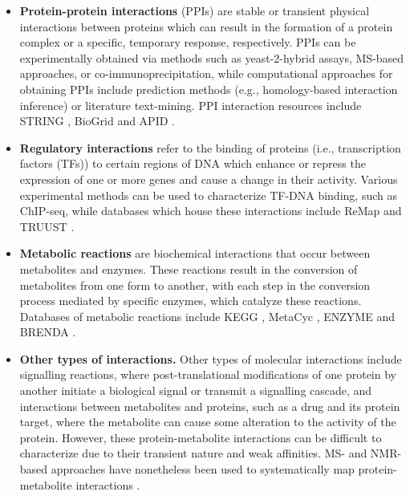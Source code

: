 \begin{itemize}
    \item   \textbf{Protein-protein interactions} (PPIs) are stable or transient physical interactions between proteins which can result in the formation of a protein complex or a specific, temporary response, respectively. PPIs can be experimentally obtained via methods such as yeast-2-hybrid assays, MS-based approaches, or co-immunoprecipitation, while computational approaches for obtaining PPIs include prediction methods (e.g., homology-based interaction inference) or literature text-mining. PPI interaction resources include STRING \parencite{szklarczyk2021}, BioGrid \parencite{oughtred2019} and APID \parencite{alonso2019}. 

    \item   \textbf{Regulatory interactions} refer to the binding of proteins (i.e., transcription factors (TFs)) to certain regions of DNA which enhance or repress the expression of one or more genes and cause a change in their activity. Various experimental methods can be used to characterize TF-DNA binding, such as ChIP-seq, while databases which house these interactions include ReMap \parencite{hammal2022} and TRUUST \parencite{han2018}. 

    \item   \textbf{Metabolic reactions} are biochemical interactions that occur between metabolites and enzymes. These reactions result in the conversion of metabolites from one form to another, with each step in the conversion process mediated by specific enzymes, which catalyze these reactions. Databases of metabolic reactions include KEGG \parencite{kanehisa2000}, MetaCyc \parencite{caspi2014}, ENZYME \parencite{bairoch2000} and BRENDA \parencite{chang2021}. 
    
    \item   \textbf{Other types of interactions.} Other types of molecular interactions include signalling reactions, where post-translational modifications of one protein by another initiate a biological signal or transmit a signalling cascade, and interactions between metabolites and proteins, such as a drug and its protein target, where the metabolite can cause some alteration to the activity of the protein. However, these protein-metabolite interactions can be difficult to characterize due to their transient nature and weak affinities. MS- and NMR- based approaches have nonetheless been used to systematically map protein-metabolite interactions \parencite{li2020,diether2019}.
\end{itemize}

